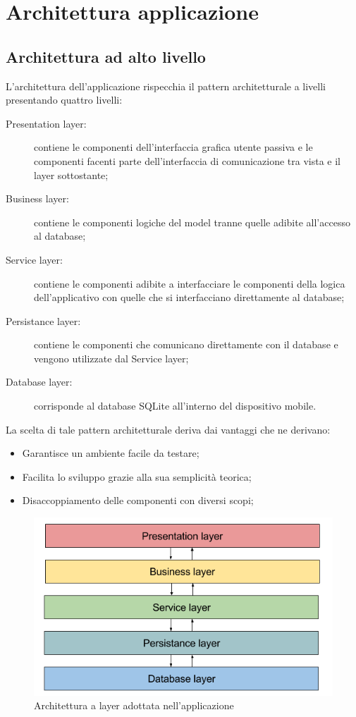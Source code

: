 \documentclass[../DefinizioneDiProdotto.tex]{subfiles}
\begin{document}
\section{Architettura applicazione}

	\subsection{Architettura ad alto livello}
		L'architettura dell'applicazione rispecchia il pattern architetturale a livelli presentando quattro livelli:
		\begin{description}
			\item[Presentation layer:] contiene le componenti dell'interfaccia grafica utente passiva e le componenti facenti parte dell'interfaccia di comunicazione tra vista e il layer sottostante;
			\item[Business layer:] contiene le componenti logiche del model tranne quelle adibite all'accesso al database;
			\item[Service layer:] contiene le componenti adibite a interfacciare le componenti della logica dell'applicativo con quelle che si interfacciano direttamente al database;
			\item[Persistance layer:] contiene le componenti che comunicano direttamente con il database e vengono utilizzate dal Service layer; 
			\item[Database layer:] corrisponde al database SQLite all'interno del dispositivo mobile.
		\end{description}
	La scelta di tale pattern architetturale deriva dai vantaggi che ne derivano:
	\begin{itemize}
		\item Garantisce un ambiente facile da testare;
		\item Facilita lo sviluppo grazie alla sua semplicità teorica;
		\item Disaccoppiamento delle componenti con diversi scopi;
	\end{itemize}
	
	\begin{figure} [h]
		\centering
		\includegraphics[scale=0.4]{img/LayeredArchitecture}
		\caption{Architettura a layer adottata nell'applicazione}
		\label{fig:LayerArchitecture}
	\end{figure}
		
	
		
		
\end{document}
